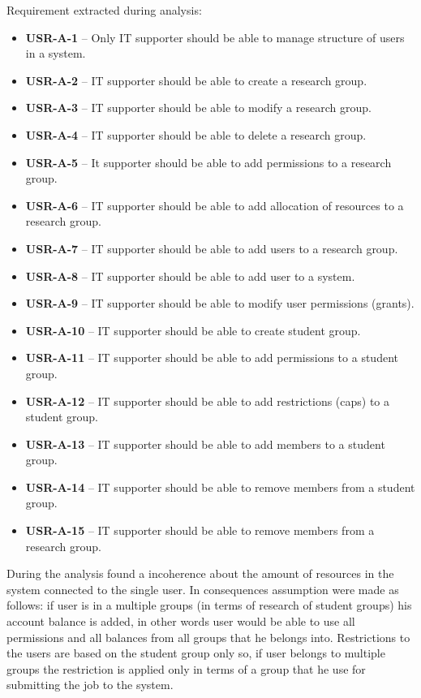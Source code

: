 \documentclass{report}
\begin{document}
Requirement extracted during analysis:
\begin{itemize}
	\item
	{
		\textbf{USR-A-1} -- Only IT supporter should be able to manage structure of users in a system.
	}
	\item
	{
		\textbf{USR-A-2} -- IT supporter should be able to create a research group.
	}
	\item
	{
		\textbf{USR-A-3} -- IT supporter should be able to modify a research group.
	}
	\item
	{
		\textbf{USR-A-4} -- IT supporter should be able to delete a research group.
	}
	\item
	{
		\textbf{USR-A-5} -- It supporter should be able to add permissions to a research group.
	}
	\item
	{
		\textbf{USR-A-6} -- IT supporter should be able to add allocation of resources to a research group.
	}
	\item
	{
		\textbf{USR-A-7} -- IT supporter should be able to add users to a research group.
	}
	\item
	{
		\textbf{USR-A-8} -- IT supporter should be able to add user to a system.
	}
	\item
	{
		\textbf{USR-A-9} -- IT supporter should be able to modify user permissions (grants).
	}
	\item
	{
		\textbf{USR-A-10} -- IT supporter should be able to create student group.
	}
	\item
	{
		\textbf{USR-A-11} -- IT supporter should be able to add permissions to a student group.
	}
	\item
	{
		\textbf{USR-A-12} -- IT supporter should be able to add restrictions (caps) to a student group.
	}
	\item
	{
		\textbf{USR-A-13} -- IT supporter should be able to add members to a student group.
	}
	\item
	{
		\textbf{USR-A-14} -- IT supporter should be able to remove members from a student group.
	}
	\item
	{
		\textbf{USR-A-15} -- IT supporter should be able to remove members from a research group.
	}
\end{itemize}
	During the analysis found a incoherence about the amount of resources in the system connected to the single user. In consequences assumption were made as follows: if user is in a multiple groups (in terms of research of student groups) his account balance is added, in other words user would be able to use all permissions and all balances from all groups that he belongs into. Restrictions to the users are based on the student group only so, if user belongs to multiple groups the restriction is applied only in terms of a group that he use for submitting the job to the system.
\end{document}
